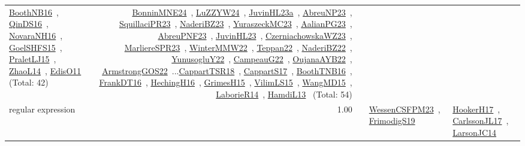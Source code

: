 {\begin{longtable}{p{3cm}r>{\raggedright\arraybackslash}p{6cm}>{\raggedright\arraybackslash}p{6cm}>{\raggedright\arraybackslash}p{8cm}}
\href{../works/BoothNB16.pdf}{BoothNB16}~\cite{BoothNB16}, \href{../works/QinDS16.pdf}{QinDS16}~\cite{QinDS16}, \href{../works/NovaraNH16.pdf}{NovaraNH16}~\cite{NovaraNH16}, \href{../works/GoelSHFS15.pdf}{GoelSHFS15}~\cite{GoelSHFS15}, \href{../works/PraletLJ15.pdf}{PraletLJ15}~\cite{PraletLJ15}, \href{../works/ZhaoL14.pdf}{ZhaoL14}~\cite{ZhaoL14}, \href{../works/EdisO11.pdf}{EdisO11}~\cite{EdisO11} (Total: 42) & \href{../works/BonninMNE24.pdf}{BonninMNE24}~\cite{BonninMNE24}, \href{../works/LuZZYW24.pdf}{LuZZYW24}~\cite{LuZZYW24}, \href{../works/JuvinHL23a.pdf}{JuvinHL23a}~\cite{JuvinHL23a}, \href{../works/AbreuNP23.pdf}{AbreuNP23}~\cite{AbreuNP23}, \href{../works/SquillaciPR23.pdf}{SquillaciPR23}~\cite{SquillaciPR23}, \href{../works/NaderiBZ23.pdf}{NaderiBZ23}~\cite{NaderiBZ23}, \href{../works/YuraszeckMC23.pdf}{YuraszeckMC23}~\cite{YuraszeckMC23}, \href{../works/AalianPG23.pdf}{AalianPG23}~\cite{AalianPG23}, \href{../works/AbreuPNF23.pdf}{AbreuPNF23}~\cite{AbreuPNF23}, \href{../works/JuvinHL23.pdf}{JuvinHL23}~\cite{JuvinHL23}, \href{../works/CzerniachowskaWZ23.pdf}{CzerniachowskaWZ23}~\cite{CzerniachowskaWZ23}, \href{../works/MarliereSPR23.pdf}{MarliereSPR23}~\cite{MarliereSPR23}, \href{../works/WinterMMW22.pdf}{WinterMMW22}~\cite{WinterMMW22}, \href{../works/Teppan22.pdf}{Teppan22}~\cite{Teppan22}, \href{../works/NaderiBZ22.pdf}{NaderiBZ22}~\cite{NaderiBZ22}, \href{../works/YunusogluY22.pdf}{YunusogluY22}~\cite{YunusogluY22}, \href{../works/CampeauG22.pdf}{CampeauG22}~\cite{CampeauG22}, \href{../works/OujanaAYB22.pdf}{OujanaAYB22}~\cite{OujanaAYB22}, \href{../works/ArmstrongGOS22.pdf}{ArmstrongGOS22}~\cite{ArmstrongGOS22}...\href{../works/CappartTSR18.pdf}{CappartTSR18}~\cite{CappartTSR18}, \href{../works/CappartS17.pdf}{CappartS17}~\cite{CappartS17}, \href{../works/BoothTNB16.pdf}{BoothTNB16}~\cite{BoothTNB16}, \href{../works/FrankDT16.pdf}{FrankDT16}~\cite{FrankDT16}, \href{../works/HechingH16.pdf}{HechingH16}~\cite{HechingH16}, \href{../works/GrimesH15.pdf}{GrimesH15}~\cite{GrimesH15}, \href{../works/VilimLS15.pdf}{VilimLS15}~\cite{VilimLS15}, \href{../works/WangMD15.pdf}{WangMD15}~\cite{WangMD15}, \href{../works/LaborieR14.pdf}{LaborieR14}~\cite{LaborieR14}, \href{../works/HamdiL13.pdf}{HamdiL13}~\cite{HamdiL13} (Total: 54)\\
\index{regular expression}\index{Constraints!regular expression}regular expression &  1.00 &  & \href{../works/WessenCSFPM23.pdf}{WessenCSFPM23}~\cite{WessenCSFPM23}, \href{../works/FrimodigS19.pdf}{FrimodigS19}~\cite{FrimodigS19} & \href{../works/HookerH17.pdf}{HookerH17}~\cite{HookerH17}, \href{../works/CarlssonJL17.pdf}{CarlssonJL17}~\cite{CarlssonJL17}, \href{../works/LarsonJC14.pdf}{LarsonJC14}~\cite{LarsonJC14}\\

\end{longtable}}

